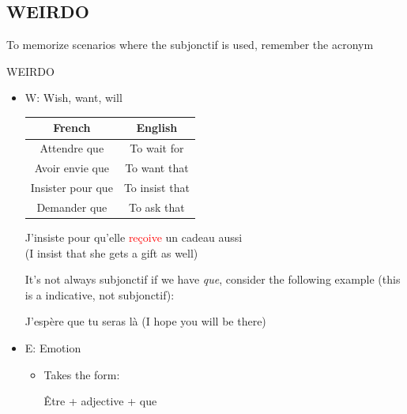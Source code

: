 \documentclass{book}
\begin{document}
    \subsection{WEIRDO}
    To memorize scenarios where the subjonctif is used, remember the acronym 
        \begin{center}
            WEIRDO
        \end{center}
        \begin{itemize}
            \item W: Wish, want, will
                \begin{center}
                    \begin{tabular}{|c|c|}
                        \hline
                        \textbf{French} & \textbf{English} \\
                        \hline
                        Attendre que & To wait for \\
                        \hline
                        Avoir envie que & To want that \\
                        \hline
                        Insister pour que & To insist that \\
                        \hline
                        Demander que & To ask that \\
                        \hline
                    \end{tabular}
                \end{center}
                \begin{center}
                    J'insiste pour qu'elle \textcolor{red}{reçoive} un cadeau aussi \\
                    (I insist that she gets a gift as well)
                \end{center}
                It's not always subjonctif if we have \textit{que}, consider the following example (this is a indicative, not subjonctif):
                \begin{center}
                    J'espère que tu seras là (I hope you will be there)
                \end{center}
                
            \item E: Emotion
                \begin{itemize}
                    \item Takes the form:
                    \begin{center}
                        Être + adjective + que
                    \end{center}


\end{itemize}
\end{itemize}
\end{document}
